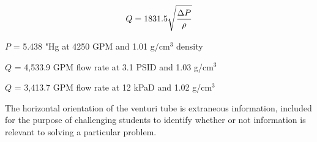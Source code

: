 
$$Q = 1831.5 \sqrt{\Delta P \over \rho}$$

\vskip 10pt

$P$ = 5.438 "Hg at 4250 GPM and 1.01 g/cm$^{3}$ density

\vskip 10pt

$Q$ = 4,533.9 GPM flow rate at 3.1 PSID and 1.03 g/cm$^{3}$

\vskip 10pt

$Q$ = 3,413.7 GPM flow rate at 12 kPaD and 1.02 g/cm$^{3}$

\vskip 10pt

The horizontal orientation of the venturi tube is extraneous information, included for the purpose of challenging students to identify whether or not information is relevant to solving a particular problem.




